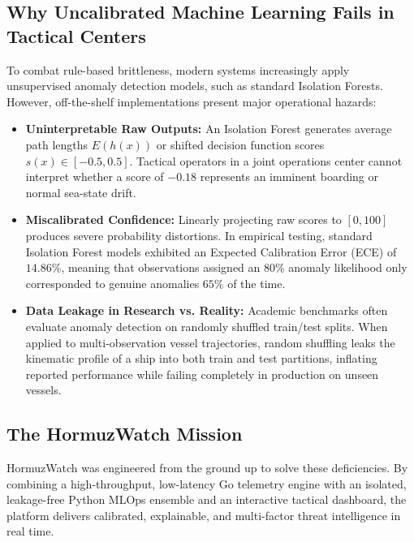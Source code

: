 \subsection{Why Uncalibrated Machine Learning Fails in Tactical Centers}
To combat rule-based brittleness, modern systems increasingly apply unsupervised anomaly detection models, such as standard Isolation Forests. However, off-the-shelf implementations present major operational hazards:
\begin{itemize}[leftmargin=*]
    \item \textbf{Uninterpretable Raw Outputs:} An Isolation Forest generates average path lengths $E(h(x))$ or shifted decision function scores $s(x) \in [-0.5, 0.5]$. Tactical operators in a joint operations center cannot interpret whether a score of $-0.18$ represents an imminent boarding or normal sea-state drift.
    \item \textbf{Miscalibrated Confidence:} Linearly projecting raw scores to $[0, 100]$ produces severe probability distortions. In empirical testing, standard Isolation Forest models exhibited an Expected Calibration Error (ECE) of $14.86\%$, meaning that observations assigned an $80\%$ anomaly likelihood only corresponded to genuine anomalies $65\%$ of the time.
    \item \textbf{Data Leakage in Research vs. Reality:} Academic benchmarks often evaluate anomaly detection on randomly shuffled train/test splits. When applied to multi-observation vessel trajectories, random shuffling leaks the kinematic profile of a ship into both train and test partitions, inflating reported performance while failing completely in production on unseen vessels.
\end{itemize}

\subsection{The HormuzWatch Mission}
HormuzWatch was engineered from the ground up to solve these deficiencies. By combining a high-throughput, low-latency Go telemetry engine with an isolated, leakage-free Python MLOps ensemble and an interactive tactical dashboard, the platform delivers calibrated, explainable, and multi-factor threat intelligence in real time.
